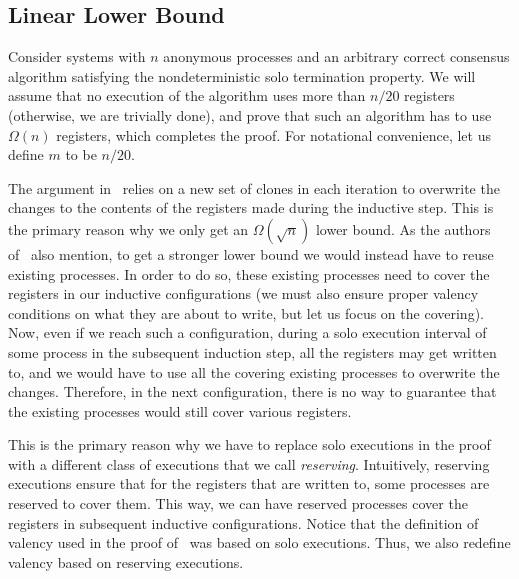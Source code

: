 \subsection{Linear Lower Bound}
\label{sec:linbound}
Consider systems with $n$ anonymous processes and an arbitrary correct consensus algorithm 
  satisfying the nondeterministic solo termination property. 
We will assume that no execution of the algorithm uses more than $n/20$ registers (otherwise, we are trivially done),
  and prove that such an algorithm has to use $\Omega(n)$ registers, which completes the proof.
For notational convenience, let us define $m$ to be $n/20$.

The argument in~ relies on a new set of clones in each iteration 
  to overwrite the changes to the contents of the registers made during the inductive step. 
This is the primary reason why we only get an $\Omega(\sqrt{n})$ lower bound.
As the authors of~\cite{FHS98} also mention,
  to get a stronger lower bound we would instead have to reuse existing processes.
In order to do so, these existing processes need to cover the registers in our inductive configurations
  (we must also ensure proper valency conditions on what they are about to write, but let us focus on the covering).
Now, even if we reach such a configuration, 
  during a solo execution interval of some process in the subsequent induction step, all the registers may get written to,
  and we would have to use all the covering existing processes to overwrite the changes.
Therefore, in the next configuration, there is no way to guarantee that the existing processes 
  would still cover various registers.

This is the primary reason why we have to replace solo executions in the proof with a different class of executions
  that we call \emph{reserving}.
Intuitively, reserving executions ensure that for the registers that are written to, 
  some processes are reserved to cover them.
This way, we can have reserved processes cover the registers in subsequent inductive configurations.
Notice that the definition of valency used in the proof of~ was based on solo executions.
Thus, we also redefine valency based on reserving executions. 

